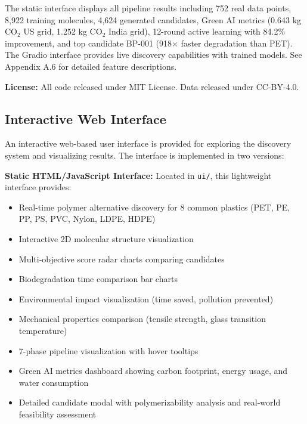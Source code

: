 \documentclass[twocolumn,10pt]{article}
\begin{document}
The static interface displays all pipeline results including 752 real data points, 8,922 training molecules, 4,624 generated candidates, Green AI metrics (0.643 kg CO$_2$ US grid, 1.252 kg CO$_2$ India grid), 12-round active learning with 84.2\% improvement, and top candidate BP-001 (918$\times$ faster degradation than PET). The Gradio interface provides live discovery capabilities with trained models. See Appendix A.6 for detailed feature descriptions.

\textbf{License:} All code released under MIT License. Data released under CC-BY-4.0.

\subsection{Interactive Web Interface}

An interactive web-based user interface is provided for exploring the discovery system and visualizing results. The interface is implemented in two versions:

\textbf{Static HTML/JavaScript Interface:} Located in \texttt{ui/}, this lightweight interface provides:
\begin{itemize}[noitemsep,leftmargin=*]
\item Real-time polymer alternative discovery for 8 common plastics (PET, PE, PP, PS, PVC, Nylon, LDPE, HDPE)
\item Interactive 2D molecular structure visualization
\item Multi-objective score radar charts comparing candidates
\item Biodegradation time comparison bar charts
\item Environmental impact visualization (time saved, pollution prevented)
\item Mechanical properties comparison (tensile strength, glass transition temperature)
\item 7-phase pipeline visualization with hover tooltips
\item Green AI metrics dashboard showing carbon footprint, energy usage, and water consumption
\item Detailed candidate modal with polymerizability analysis and real-world feasibility assessment
\end{itemize}
\end{document}
